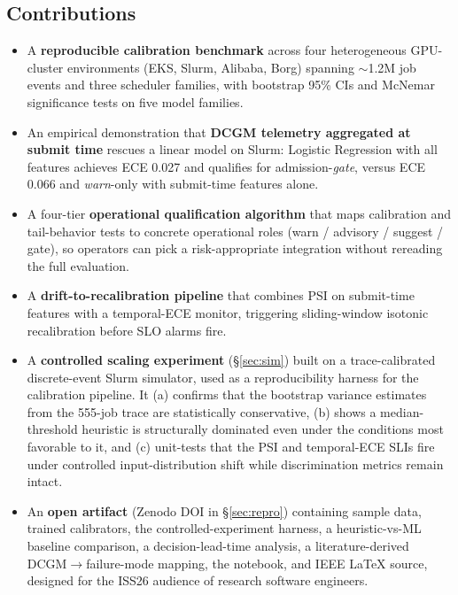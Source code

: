 \documentclass[conference]{IEEEtran}
\begin{document}
\subsection{Contributions}
\begin{itemize}
    \item A \textbf{reproducible calibration benchmark} across four heterogeneous GPU-cluster environments (EKS, Slurm, Alibaba, Borg) spanning $\sim$1.2M job events and three scheduler families, with bootstrap 95\% CIs and McNemar significance tests on five model families.
    \item An empirical demonstration that \textbf{DCGM telemetry aggregated at submit time} rescues a linear model on Slurm: Logistic Regression with all features achieves ECE 0.027 and qualifies for admission-\textit{gate}, versus ECE 0.066 and \textit{warn}-only with submit-time features alone.
    \item A four-tier \textbf{operational qualification algorithm} that maps calibration and tail-behavior tests to concrete operational roles (warn / advisory / suggest / gate), so operators can pick a risk-appropriate integration without rereading the full evaluation.
    \item A \textbf{drift-to-recalibration pipeline} that combines PSI on submit-time features with a temporal-ECE monitor, triggering sliding-window isotonic recalibration before SLO alarms fire.
    \item A \textbf{controlled scaling experiment} (\S\ref{sec:sim}) built on a trace-calibrated discrete-event Slurm simulator, used as a reproducibility harness for the calibration pipeline. It (a) confirms that the bootstrap variance estimates from the 555-job trace are statistically conservative, (b) shows a median-threshold heuristic is structurally dominated even under the conditions most favorable to it, and (c) unit-tests that the PSI and temporal-ECE SLIs fire under controlled input-distribution shift while discrimination metrics remain intact.
    \item An \textbf{open artifact} (Zenodo DOI in \S\ref{sec:repro}) containing sample data, trained calibrators, the controlled-experiment harness, a heuristic-vs-ML baseline comparison, a decision-lead-time analysis, a literature-derived DCGM$\to$failure-mode mapping, the notebook, and IEEE \LaTeX{} source, designed for the ISS26 audience of research software engineers.
\end{itemize}
\end{document}
